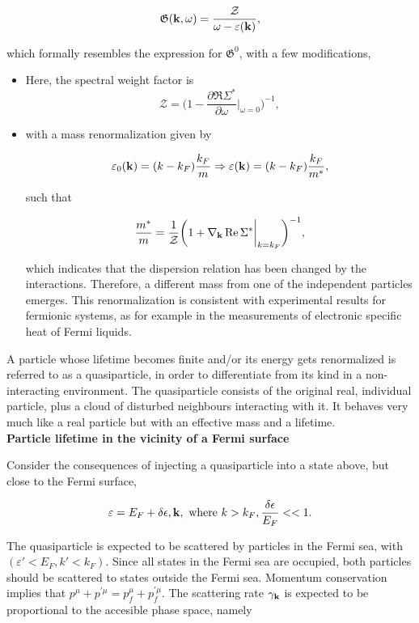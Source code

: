 \documentclass{homework}
\begin{document}
\begin{equation}
     \mathfrak{G}({\bf k}, \omega) = \frac{\mathcal{Z}}{\omega - \varepsilon({\bf k})},
\end{equation}

which formally resembles the expression for $ \mathfrak{G}^{0}$, with a few modifications, 

\begin{itemize}
    \item Here, the spectral weight factor is 
    $$
     \mathcal{Z} = \bigg(1 - \frac{\partial \Re \Sigma^*}{\partial \omega}\bigg|_{\omega = 0}\bigg)^{-1},
    $$
    
    \item with a mass renormalization given by 
    
    $$ 
        \varepsilon_0({\bf k}) = (k-k_F) \frac{k_F}{m} \Rightarrow \varepsilon({\bf k}) = (k-k_F) \frac{k_F}{m^*},
    $$
    
    such that 
    
    $$
        \frac{m^*}{m} = \frac{1}{\mathcal{Z}} \bigg(1 + \nabla_{{\bf k}} \Re \Sigma^*\bigg|_{k=k_F}\bigg)^{-1},
    $$
    
    which indicates that the dispersion relation has been changed by the interactions. Therefore, a different mass from one of the independent particles emerges. This renormalization is consistent with experimental results for fermionic systems, as for example in the measurements of electronic specific heat of Fermi liquids. \\
\end{itemize}

A particle whose lifetime becomes finite and/or its energy gets renormalized is referred to as a quasiparticle, in order to differentiate from its kind in a non-interacting environment. The quasiparticle consists of the original real, individual particle, plus a cloud of disturbed neighbours interacting with it. It behaves very much like a real particle but with an effective mass and a lifetime. \\

\textbf{Particle lifetime in the vicinity of a Fermi surface}

Consider the consequences of injecting a quasiparticle into a state above, but close to the Fermi surface, 

$$
    \varepsilon = E_F + \delta \epsilon, {\bf k}, \textnormal{ where } k > k_F, \frac{\delta \epsilon}{E_F} << 1.
$$

The quasiparticle is expected to be scattered by particles in the Fermi sea, with $(\varepsilon' < E_F, k' < k_F)$. Since all states in the Fermi sea are occupied, both particles should be scattered to states outside the Fermi sea. Momentum conservation implies that $p^{\mu} + p^{'\mu} = p^{\mu}_f + p^{'\mu}_f$. The scattering rate $\gamma_{\bf k}$ is expected to be proportional to the accesible phase space, namely 
\end{document}
